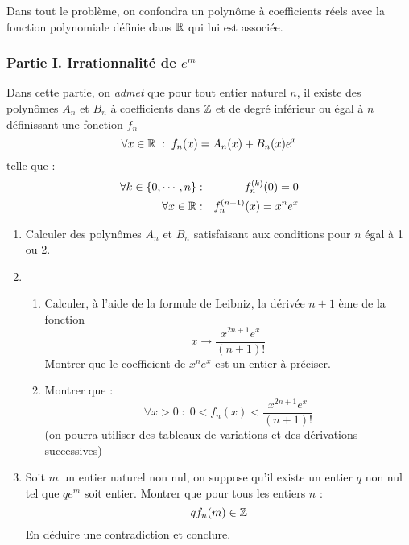 Dans tout le problème, on confondra un polynôme à coefficients réels avec la fonction polynomiale définie dans $\mathbb{R}$ qui lui est associée.
\subsubsection*{Partie I. Irrationnalité de $e^m$}
Dans cette partie, on \emph{admet} que pour tout entier naturel $n$, il existe des polynômes $A_n$ et $B_n$ à coefficients dans $\mathbb{Z}$ et de degré inférieur ou égal à $n$ définissant une fonction $f_n$
\[\forall x \in \mathbb{R}\; : \; f_n(x)= A_n(x)+B_n(x)e^x\]
telle que :
\begin{eqnarray*}
 \forall k \in \{0,\cdots,n\} &:& f_n^{(k)}(0)=0 \\
\forall x \in \mathbb{R} &:& f_n^{(n+1)}(x)=x^ne^x
\end{eqnarray*}
\begin{enumerate}
 \item Calculer des polynômes $A_n$ et $B_n$ satisfaisant aux conditions pour $n$ égal à 1 ou 2.
 \item \begin{enumerate}
   \item Calculer, à l'aide de la formule de Leibniz, la dérivée $n+1$ ème de la fonction
\[x \rightarrow \frac{x^{2n+1}e^x}{(n+1)!}\]
Montrer que le coefficient de $x^ne^x$ est un entier à préciser.
  \item Montrer que :
\[\forall x >0 \;:\; 0<f_n(x)<\frac{x^{2n+1}e^x}{(n+1)!}\]
(on pourra utiliser des tableaux de variations et des dérivations successives) 
  \end{enumerate}
 \item Soit $m$ un entier naturel non nul, on suppose qu'il existe un entier $q$ non nul tel que $qe^m$ soit entier. Montrer que pour tous les entiers $n$ :
\[qf_n(m)\in \mathbb{Z}\]
En déduire une contradiction et conclure.
\end{enumerate}

